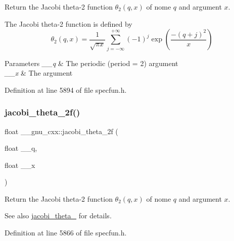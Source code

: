 Return the Jacobi theta-\/2 function $ \theta_2(q,x) $ of nome $ q $ and argument $ x $.

The Jacobi theta-\/2 function is defined by \[ \theta_2(q,x) = \frac{1}{\sqrt{\pi x}} \sum_{j=-\infty}^{+\infty} (-1)^j \exp\left( \frac{-(q + j)^2}{x} \right) \]


\begin{DoxyParams}{Parameters}
{\em \+\_\+\+\_\+q} & The periodic (period = 2) argument \\
\hline
{\em \+\_\+\+\_\+x} & The argument \\
\hline
\end{DoxyParams}


Definition at line 5894 of file specfun.\+h.

\mbox{\label{group__gnu__math__spec__func_gaa99e91c0753410a42b57cbf417cf7ea0}} 
\subsubsection{\texorpdfstring{jacobi\+\_\+theta\+\_\+2f()}{jacobi\_theta\_2f()}}
{\footnotesize\ttfamily float \+\_\+\+\_\+gnu\+\_\+cxx\+::jacobi\+\_\+theta\+\_\+2f (\begin{DoxyParamCaption}\item[{float}]{\+\_\+\+\_\+q,  }\item[{float}]{\+\_\+\+\_\+x }\end{DoxyParamCaption})\hspace{0.3cm}{\ttfamily [inline]}}

Return the Jacobi theta-\/2 function $ \theta_2(q,x) $ of nome $ q $ and argument $ x $.

\begin{DoxySeeAlso}{See also}
\hyperlink{group__gnu__math__spec__func_gaf6b13dac1f112a870299d75cb4cf42cc}{jacobi\+\_\+theta\+\_} for details. 
\end{DoxySeeAlso}


Definition at line 5866 of file specfun.\+h.

\mbox{\label{group__gnu__math__spec__func_ga2db5cb3025b9068e79dc7aa21bc9af5b}} 
